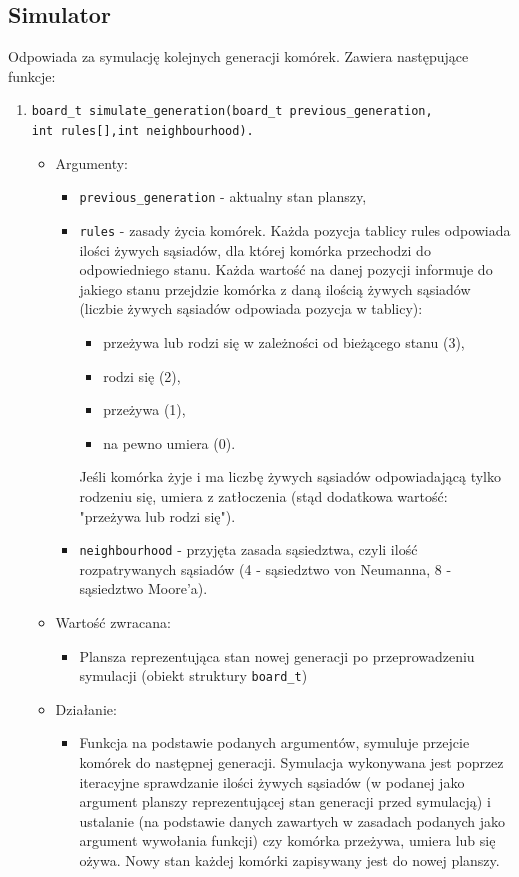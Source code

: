 \documentclass[a4paper,11pt, notitlepage ]{article}
\begin{document}
\subsection{Simulator}
Odpowiada za symulację kolejnych generacji komórek. Zawiera następujące funkcje:
\begin{enumerate}

\item \verb+board_t simulate_generation(board_t previous_generation,+ \\\verb+int rules[],int neighbourhood).+
\begin{itemize}
\item Argumenty:
\begin{itemize}
\item \verb+previous_generation+ - aktualny stan planszy,
\item \verb+rules+ - zasady życia komórek. Każda pozycja tablicy rules odpowiada ilości żywych sąsiadów, dla której komórka przechodzi do odpowiedniego stanu. Każda wartość na danej pozycji informuje do jakiego stanu przejdzie komórka z daną ilością żywych sąsiadów (liczbie żywych sąsiadów odpowiada pozycja w tablicy): 
\begin{itemize}
	\item przeżywa lub rodzi się w zależności od bieżącego stanu (3),
	\item rodzi się (2), 
	\item przeżywa (1), 
	\item na pewno umiera (0).
\end{itemize}
Jeśli komórka żyje i ma liczbę żywych sąsiadów odpowiadającą tylko rodzeniu się, umiera z zatłoczenia (stąd dodatkowa wartość: "przeżywa lub rodzi się").
\item \verb+neighbourhood+ - przyjęta zasada sąsiedztwa, czyli ilość rozpatrywanych sąsiadów (4 - sąsiedztwo von Neumanna, 8 - sąsiedztwo Moore'a).
\end{itemize}
\item Wartość zwracana:
\begin{itemize}
\item Plansza reprezentująca stan nowej generacji po przeprowadzeniu symulacji (obiekt struktury \verb+board_t+)
\end{itemize}
\item Działanie:
\begin{itemize}
\item Funkcja na podstawie podanych argumentów, symuluje przejcie komórek do następnej generacji. Symulacja wykonywana jest poprzez iteracyjne sprawdzanie ilości żywych sąsiadów 
(w podanej jako argument planszy reprezentującej stan generacji przed symulacją) i ustalanie (na podstawie danych zawartych w zasadach podanych jako argument wywołania funkcji) czy komórka przeżywa, umiera lub się ożywa.
Nowy stan każdej komórki zapisywany jest do nowej planszy.
\end{itemize}
\end{itemize}



\end{enumerate}
\end{document}

